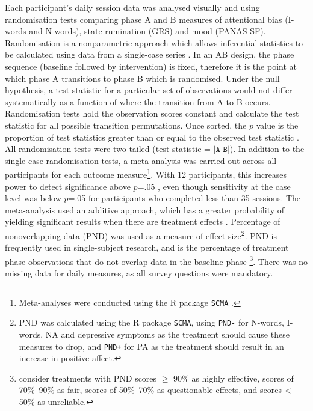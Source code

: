 \documentclass[man,floatsintext,a4paper,biblatex]{apa6}\usepackage[]{graphicx}\usepackage[]{color}
\begin{document}
Each participant's daily session data was analysed visually and
using randomisation tests comparing phase A and B measures of
attentional bias (I-words and N-words), state rumination (GRS) and
mood (PANAS-SF). Randomisation is a nonparametric approach which
allows inferential statistics to be calculated using data from
a single-case series \parencite{bulte_r_2008}. In an AB design,
the phase sequence (baseline followed by intervention) is fixed,
therefore it is the point at which phase A transitions to phase B
which is randomised. Under the null hypothesis, a test statistic for
a particular set of observations would not differ systematically as a
function of where the transition from A to B occurs. Randomisation tests
hold the observation scores constant and calculate the test statistic
for all possible transition permutations. Once sorted, the ${p}$ value
is the proportion of test statistics greater than or equal to the
observed test statistic \parencite{onghena_customization_2005}. All
randomisation tests were two-tailed (test statistic = \(\lvert
\texttt{A-B}\rvert\)). In addition to the single-case randomisation
tests, a meta-analysis \parencite[][p.64]{onghena_customization_2005}
was carried out across all participants for each outcome
measure\footnote{Meta-analyses were conducted using the R
package \texttt{SCMA} \parencite{bulte_singlecase_2013}.}. With 12
participants, this increases power to detect significance above ${p}$=.05
\parencite[][p.64]{onghena_customization_2005}, even though sensitivity
at the case level was below ${p}$=.05 for participants who completed less
than 35 sessions. The meta-analysis used an additive approach, which
has a greater probability of yielding significant results when there
are treatment effects \parencite{edgington_additive_1972}. Percentage
of nonoverlapping data (PND) was used as a measure of effect
size\footnote{PND was calculated using the R package \texttt{SCMA}, using
\texttt{PND-} for N-words, I-words, NA and depressive symptoms as the
treatment should cause these measures to drop, and \texttt{PND+} for PA
as the treatment should result in an increase in positive affect.}. PND
is frequently used in single-subject research, and is the percentage of
treatment phase observations that do not overlap data in the baseline
phase \parencite{scruggs_pnd_2013}\footnote{\textcite{scruggs_early_1986}
consider treatments with PND scores ${\geq}$ 90\% as highly effective,
scores of 70\%--90\% as fair, scores of 50\%--70\% as questionable
effects, and scores <~ 50\% as unreliable.}. There was no missing data
for daily measures, as all survey questions were mandatory.
\end{document}
